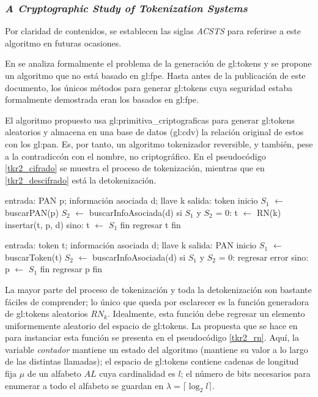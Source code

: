 %
%

\subsubsection{\textit{A Cryptographic Study of Tokenization Systems}}

Por claridad de contenidos, se establecen las siglas \textit{ACSTS} para
referirse a este algoritmo en futuras ocasiones.

En \cite{doc_sandra} se analiza formalmente el problema de la generación de
\glspl{gl:token} y se propone un algoritmo que no está basado en \gls{gl:fpe}.
Hasta antes de la publicación de este documento, los únicos métodos para
generar \glspl{gl:token} cuya seguridad estaba formalmente demostrada eran los
basados en \gls{gl:fpe}.

El algoritmo propuesto usa \glspl{gl:primitiva_criptografica} para generar
\glspl{gl:token} aleatorios y almacena en una base de datos (\gls{gl:cdv}) la
relación original de estos con los \gls{gl:pan}. Es, por tanto, un algoritmo
tokenizador reversible, y también, pese a la contradiccón con el nombre, no
criptográfico.  En el pseudocódigo \ref{tkr2_cifrado} se muestra el proceso
de tokenización, mientras que en \ref{tkr2_descifrado} está la detokenización.

\begin{pseudocodigo}[%
    caption={\textit{ACSTS}, método de tokenización},
    label={tkr2_cifrado}%
  ]
  entrada: PAN p; información asociada d; llave k
  salida:  token
  inicio
    $ S_1 $ $ \gets $ buscarPAN(p)
    $ S_2 $ $ \gets $ buscarInfoAsociada(d)
    si $ S_1 $ y $ S_2 $ = 0:
      t $ \gets $ RN(k)
      insertar(t, p, d)
    sino:
      t $ \gets $ $ S_1 $
    fin
    regresar t
  fin
\end{pseudocodigo}

\begin{pseudocodigo}[%
    caption={\textit{ACSTS}, método de detokenización},
    label={tkr2_descifrado}%
  ]
  entrada: token t; información asociada d; llave k
  salida:  PAN
  inicio
    $ S_1 $ $ \gets $ buscarToken(t)
    $ S_2 $ $ \gets $ buscarInfoAsociada(d)
    si $ S_1 $ y $ S_2 $ = 0:
      regresar error
    sino:
      p $ \gets $ $ S_1 $
    fin
    regresar p
  fin
\end{pseudocodigo}

La mayor parte del proceso de tokenización y toda la detokenización son
bastante fáciles de comprender; lo único que queda por esclarecer es la
función generadora de \glspl{gl:token} aleatorios $ RN_k $. Idealmente,
esta función debe regresar un elemento uniformemente aleatorio del espacio
de \glspl{gl:token}. La propuesta que se hace en \cite{doc_sandra} para
instanciar esta función se presenta en el pseudocódigo \ref{tkr2_rn}.
Aquí, la variable \textit{contador} mantiene un estado del algoritmo (mantiene
su valor a lo largo de las distintas llamadas); el espacio de \glspl{gl:token}
contiene cadenas de longitud fija $ \mu $ de un alfabeto $ AL $ cuya
cardinalidad es $ l $; el número de bits necesarios para enumerar a todo el
alfabeto se guardan en $ \lambda = \lceil \log_2 l \rceil$.

